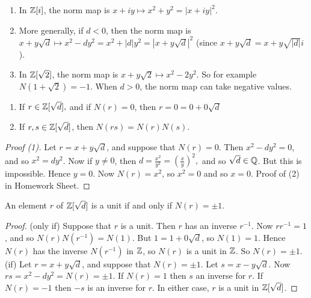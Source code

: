\begin{examples}\begin{enumerate}
\item In $\mathbb{Z}[i]$, the norm map is $x + iy \mapsto x^2 + y^2 = |x + iy|^2$.
\item More generally, if $d < 0$, then the norm map is $x+ y\sqrt{d} \mapsto x^2 - dy^2 = x^2 + |d|y^2 = |x + y\sqrt{d}|^2$ (since $x + y\sqrt{d} = x+y\sqrt{|d|}i$).
\item In $\mathbb{Z}[\sqrt{2}]$, the norm map is $x + y\sqrt{2} \mapsto x^2 - 2y^2$. So for example $N(1 + \sqrt{2}) = -1$. When $d > 0$, the norm map can take negative values.
 \end{enumerate}\end{examples}\vspace*{10pt}
 
\begin{proposition}\begin{enumerate}
 \item If $r \in \mathbb{Z}[\sqrt{d}],$ and if $N(r) = 0$, then $r = 0 = 0 + 0\sqrt{d}$
 \item 	If $r,s \in \mathbb{Z}[\sqrt{d}]$, then $N(rs) = N(r)N(s)$.
 \end{enumerate}\end{proposition}
\begin{proof} [Proof (1)] 
Let $r = x + y\sqrt{d}$, and suppose that $N(r) = 0$. Then $x^2 - dy^2 = 0$, and so $x^2 = dy^2$. Now if $y \neq 0$, then $d =\frac{x^2}{y^2} = \left(\frac{x}{y}\right)^2,$ and so $\sqrt{d} \in \mathbb{Q}$. But this is impossible. Hence $y = 0$. Now $N(r) = x^2$, so $x^2 = 0$ and so $x = 0$. Proof of (2) in Homework Sheet.
\end{proof}\vspace*{5pt}



\begin{proposition} An   
 element $r$ of $\mathbb{Z}[\sqrt{d}]$ is a unit if and only if $N(r) = \pm 1$. \end{proposition}
\begin{proof}
(only if) Suppose that $r$ is a unit. Then $r$ has an inverse $r^{-1}$. Now $rr^{-1} = 1$, and so $N(r)N(r^{-1}) = N(1)$. But $1 = 1 + 0 \sqrt{d}$, so $N(1) = 1$. Hence $N(r)$ has the inverse $N(r^{-1})$ in $\mathbb{Z}$, so $N(r)$ is a unit in $\mathbb{Z}$. So $N(r) = \pm 1$. \\

(if) Let $r = x + y\sqrt{d}$, and suppose that $N(r) = \pm 1$. Let $s = x - y\sqrt{d}$. Now $rs = x^2 - dy^2 = N(r) = \pm 1$. If $N(r) = 1$ then $s$ an inverse for $r$. If $N(r) = -1$  then $-s$ is an inverse for $r$. In either case, $r$ is a unit in $\mathbb{Z}[\sqrt{d}]$.
\end{proof}\vspace*{5pt}

